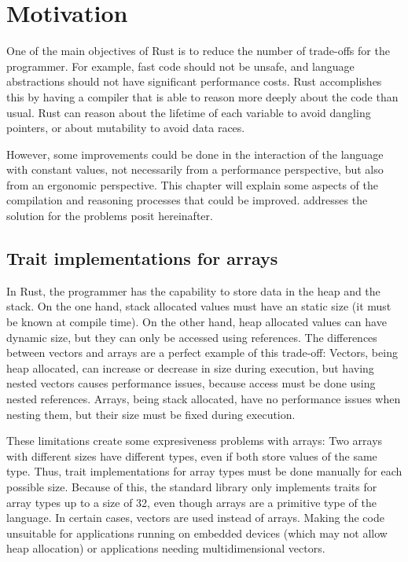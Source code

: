\chapter{Motivation}
One of the main objectives of Rust is to reduce the number of trade-offs for
the programmer. For example, fast code should not be unsafe, and language
abstractions should not have significant performance costs. Rust accomplishes
this by having a compiler that is able to reason more deeply about the code
than usual. Rust can reason about the lifetime of each variable to avoid
dangling pointers, or about mutability to avoid data races. 

However, some improvements could be done in the interaction of the language
with constant values, not necessarily from a performance perspective, but also
from an ergonomic perspective. This chapter will explain some aspects of the
compilation and reasoning processes that could be improved.
 addresses the solution for the problems
posit hereinafter.

\label{chap:motivation}
\section{Trait implementations for arrays}
In Rust, the programmer has the capability to store data in the heap and the
stack. On the one hand, stack allocated values must have an static size (it
must be known at compile time). On the other hand, heap allocated values can
have dynamic size, but they can only be accessed using references. The
differences between vectors and arrays are a perfect example of this trade-off:
Vectors, being heap allocated, can increase or decrease in size during
execution, but having nested vectors causes performance issues, because access
must be done using nested references. Arrays, being stack allocated, have no
performance issues when nesting them, but their size must be fixed during
execution.

These limitations create some expresiveness problems with arrays: Two arrays
with different sizes have different types, even if both store values of the
same type. Thus, trait implementations for array types must be done manually
for each possible size. Because of this, the standard library only implements
traits for array types up to a size of 32, even though arrays are a primitive
type of the language. In certain cases, vectors are used instead of arrays.
Making the code unsuitable for applications running on embedded devices (which
may not allow heap allocation) or applications needing multidimensional
vectors.

